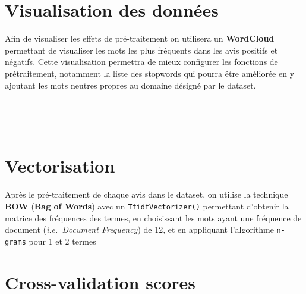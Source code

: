 \documentclass[11pt]{article}
\begin{document}


\hypertarget{visualisation-des-donnuxe9es}{%
\section{Visualisation des
données}\label{visualisation-des-donnuxe9es}}
Afin de visualiser les effets de pré-traitement on utilisera un
\textbf{WordCloud} permettant de visualiser les mots les plus fréquents
dans les avis positifs et négatifs. Cette visualisation permettra de
mieux configurer les fonctions de prétraitement, notamment la liste des
stopwords qui pourra être améliorée en y ajoutant les mots neutres
propres au domaine désigné par le dataset.



    \begin{center}
    \end{center}
    { \hspace*{\fill} \\}



    \begin{center}
    \end{center}
    { \hspace*{\fill} \\}

\hypertarget{vectorisation}{%
\section{Vectorisation}\label{vectorisation}}
Après le pré-traitement de chaque avis dans le dataset, on utilise la
technique \textbf{BOW} (\textbf{Bag of Words}) avec un
\texttt{TfidfVectorizer()} permettant d'obtenir la matrice des
fréquences des termes, en choisissant les mots ayant une fréquence de
document (\emph{i.e.~Document Frequency}) de 12, et en appliquant
l'algorithme \texttt{n-grams} pour 1 et 2 termes



\hypertarget{cross-validation-scores}{%
\section{Cross-validation
scores}\label{cross-validation-scores}}
\end{document}
